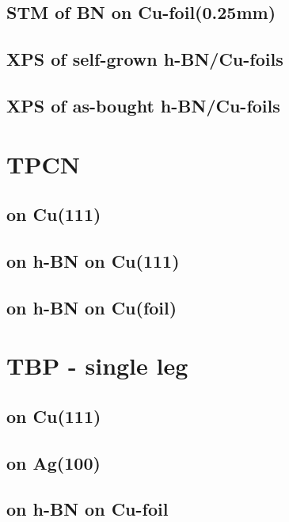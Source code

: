\documentclass[10pt,a4paper,twoside
,BCOR=8mm				%
]{scrbook}
\begin{document}
  \section{STM of BN on Cu-foil(0.25mm)}
     
  \section{XPS of self-grown h-BN/Cu-foils}
     
  \section{XPS of as-bought h-BN/Cu-foils}
     
\printbibliography 	
\chapter{TPCN}
    \section{on Cu(111)}
       
    \section{on h-BN on Cu(111)}
       
    \section{on h-BN on Cu(foil)}
       
\printbibliography
\chapter{TBP - single leg}
   
   \section{on Cu(111)}
      
   \section{on Ag(100)}
      
   \section{on h-BN on Cu-foil}
      
\end{document}
